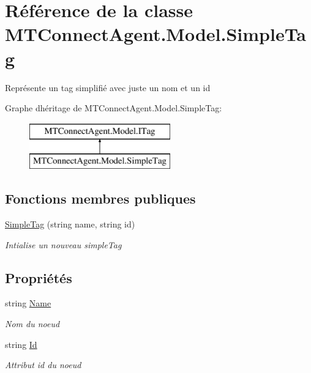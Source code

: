 \hypertarget{class_m_t_connect_agent_1_1_model_1_1_simple_tag}{}\section{Référence de la classe M\+T\+Connect\+Agent.\+Model.\+Simple\+Tag}
\label{class_m_t_connect_agent_1_1_model_1_1_simple_tag}


Représente un tag simplifié avec juste un nom et un id  


Graphe d\textquotesingle{}héritage de M\+T\+Connect\+Agent.\+Model.\+Simple\+Tag\+:\begin{figure}[H]
\begin{center}
\leavevmode
\includegraphics[height=2.000000cm]{class_m_t_connect_agent_1_1_model_1_1_simple_tag}
\end{center}
\end{figure}
\subsection*{Fonctions membres publiques}
\begin{DoxyCompactItemize}
\item 
\mbox{\hyperlink{class_m_t_connect_agent_1_1_model_1_1_simple_tag_aaabaf414bb2d1d2c9ebf18901563d8d8}{Simple\+Tag}} (string name, string id)
\begin{DoxyCompactList}\small\item\em Intialise un nouveau simple\+Tag \end{DoxyCompactList}\end{DoxyCompactItemize}
\subsection*{Propriétés}
\begin{DoxyCompactItemize}
\item 
string \mbox{\hyperlink{class_m_t_connect_agent_1_1_model_1_1_simple_tag_a6af48b2c6f3ab02d83de0c7cb2acb2e1}{Name}}
\begin{DoxyCompactList}\small\item\em Nom du noeud \end{DoxyCompactList}\item 
string \mbox{\hyperlink{class_m_t_connect_agent_1_1_model_1_1_simple_tag_abce1b5edabf2d2724ead893822dcc9ff}{Id}}
\begin{DoxyCompactList}\small\item\em Attribut id du noeud \end{DoxyCompactList}\end{DoxyCompactItemize}


